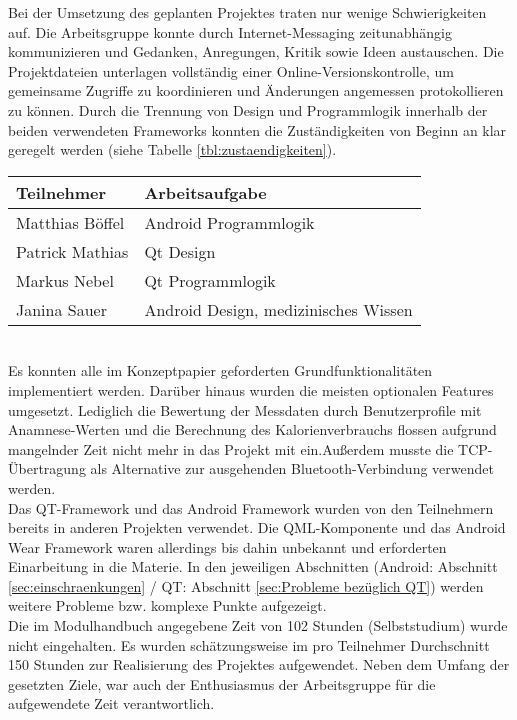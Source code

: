 Bei der Umsetzung des geplanten Projektes traten nur wenige Schwierigkeiten auf. Die Arbeitsgruppe konnte durch Internet-Messaging zeitunabhängig kommunizieren und Gedanken, Anregungen, Kritik sowie Ideen austauschen. Die Projektdateien unterlagen vollständig einer Online-Versionskontrolle, um gemeinsame Zugriffe zu koordinieren und Änderungen angemessen protokollieren zu können. Durch die Trennung von Design und Programmlogik innerhalb der beiden verwendeten Frameworks konnten die Zuständigkeiten von Beginn an klar geregelt werden (siehe Tabelle \ref{tbl:zustaendigkeiten}).\\
\begin{table*}[h]
	\centering
		\begin{tabularx}{\textwidth}{l|X}
			\hline
			Teilnehmer & Arbeitsaufgabe \\
			\hline
			\hline
			Matthias Böffel & Android Programmlogik\\
			\hline
			Patrick Mathias & Qt Design\\
			\hline
			Markus Nebel & Qt Programmlogik\\
			\hline
			Janina Sauer & Android Design, medizinisches Wissen\\
			\hline
		\end{tabularx}
		\caption{Arbeitsaufgaben der Teilnehmer}
		\label{tbl:zustaendigkeiten}
\end{table*}
\\
Es konnten alle im Konzeptpapier geforderten Grundfunktionalitäten implementiert werden. Darüber hinaus wurden die meisten optionalen Features umgesetzt. Lediglich die Bewertung der Messdaten durch Benutzerprofile mit Anamnese-Werten und die Berechnung des Kalorienverbrauchs flossen aufgrund mangelnder Zeit nicht mehr in das Projekt mit ein.Außerdem musste die TCP-Übertragung als Alternative zur ausgehenden Bluetooth-Verbindung verwendet werden.
\\[0.5cm]
Das QT-Framework und das Android Framework wurden von den Teilnehmern bereits in anderen Projekten verwendet. Die QML-Komponente und das Android Wear Framework waren allerdings bis dahin unbekannt und erforderten Einarbeitung in die Materie. In den jeweiligen Abschnitten (Android: Abschnitt \ref{sec:einschraenkungen} / QT: Abschnitt \ref{sec:Probleme bezüglich QT}) werden weitere Probleme bzw. komplexe Punkte aufgezeigt.
\\[0.5cm]
Die im Modulhandbuch angegebene Zeit von 102 Stunden (Selbststudium) wurde nicht eingehalten. Es wurden schätzungsweise im pro Teilnehmer Durchschnitt 150 Stunden zur Realisierung des Projektes aufgewendet. Neben dem Umfang der gesetzten Ziele, war auch der Enthusiasmus der Arbeitsgruppe für die aufgewendete Zeit verantwortlich.
